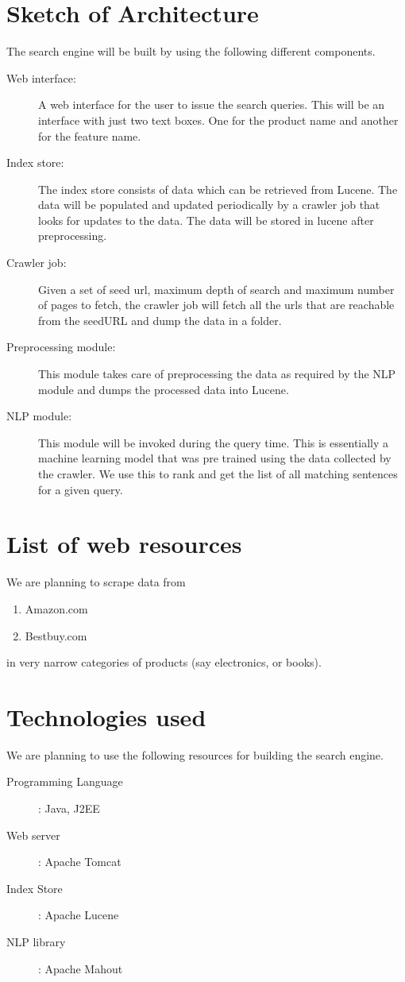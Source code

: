 \documentclass{article}
\begin{document}
\section{Sketch of Architecture}
The search engine will be built by using the following different components.
\begin{description}
  \item[Web interface:] A web interface for the user to issue the search queries.  This will be an interface with just two text boxes. One for the product name and another for the feature name.
  \item[Index store:]  The index store consists of data which can be retrieved from Lucene.  The data will be populated and updated periodically by a crawler job that looks for updates to the data.  The data will be stored in lucene after preprocessing.
  \item[Crawler job:] Given a set of seed url, maximum depth of search and maximum number of pages to fetch, the crawler job will fetch all the urls that are reachable from the seedURL and dump the data in a folder.
  \item[Preprocessing module:]  This module takes care of preprocessing the data as required by the NLP module and dumps the processed data into Lucene.
  \item[NLP module:] This module will be invoked during the query time.  This is essentially a machine learning model that was pre trained using the data collected by the crawler.  We use this to rank and get the list of all matching sentences for a given query.
\end{description}

\section{List of web resources}
We are planning to scrape data from 
\begin{enumerate}
  \item Amazon.com
  \item Bestbuy.com
\end{enumerate}
in very narrow categories of products (say electronics, or books).

\section{Technologies used}
We are planning to use the following resources for building the search engine.
\begin{description}
  \item[Programming Language]: Java, J2EE
  \item[Web server]: Apache Tomcat
  \item[Index Store]: Apache Lucene
  \item[NLP library]: Apache Mahout
\end{description}
\end{document}
